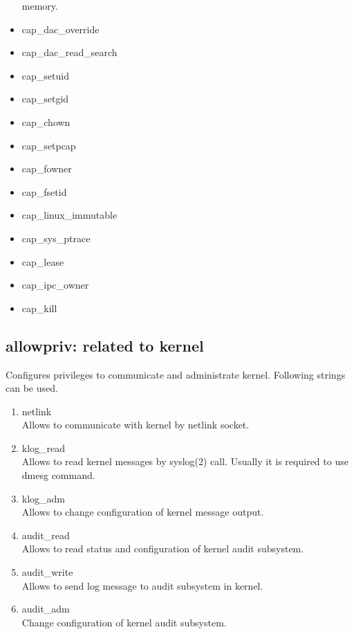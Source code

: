 \documentclass{article}
\begin{document}
\begin{itemize}
       memory.
 \item cap\_dac\_override\\ 
 \item cap\_dac\_read\_search \\
 \item cap\_setuid 
 \item cap\_setgid \\
 \item cap\_chown \\
 \item cap\_setpcap\\
 \item  cap\_fowner\\
 \item  cap\_fsetid \\
 \item cap\_linux\_immutable\\
 \item cap\_sys\_ptrace\\
\item cap\_lease\\
\item cap\_ipc\_owner\\
\item cap\_kill\\

\end{itemize}


\subsection{allowpriv: related to kernel}
Configures privileges to communicate and administrate kernel. 
Following strings can be used.
       \begin{enumerate}
	\item netlink\\
	      Allows to communicate with kernel by netlink socket. 
	\item klog\_read\\
	      Allows to read kernel messages by syslog(2) call. Usually
	      it is required to use dmesg command.
	\item klog\_adm\\
	      Allows to change configuration of kernel message output.
	\item audit\_read\\
	      Allows to read status and configuration of kernel audit
           subsystem.
	\item audit\_write\\
	      Allows to send log message to audit subsystem in
	      kernel.
	\item audit\_adm\\
	      Change configuration of kernel audit subsystem.
       
       \end{enumerate}
\end{document}
